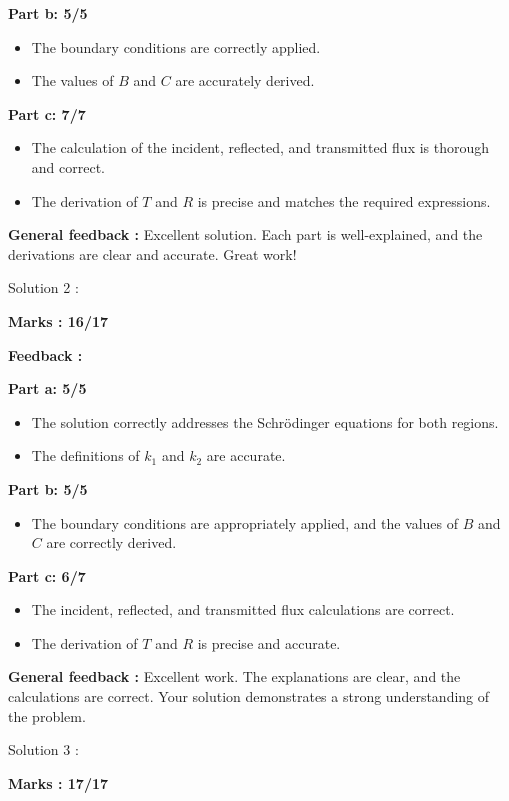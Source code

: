 \documentclass[a4paper,11pt]{article}
\begin{document}
\textbf{Part b: 5/5}
\begin{itemize}
    \item The boundary conditions are correctly applied.
    \item The values of $B$ and $C$ are accurately derived.
\end{itemize}

\textbf{Part c: 7/7}
\begin{itemize}
    \item The calculation of the incident, reflected, and transmitted flux is thorough and correct.
    \item The derivation of $T$ and $R$ is precise and matches the required expressions.
\end{itemize}


\textbf{General feedback :}
Excellent solution. Each part is well-explained, and the derivations are clear and accurate. Great work!


Solution 2 :

\textbf{Marks : 16/17}

\textbf{Feedback :}

\textbf{Part a: 5/5}
\begin{itemize}
    \item The solution correctly addresses the Schrödinger equations for both regions.
    \item The definitions of $k_1$ and $k_2$ are accurate.
\end{itemize}


\textbf{Part b: 5/5}
\begin{itemize}
    \item The boundary conditions are appropriately applied, and the values of $B$ and $C$ are correctly derived.
\end{itemize}

\textbf{Part c: 6/7}
\begin{itemize}
    \item The incident, reflected, and transmitted flux calculations are correct.
    \item The derivation of $T$ and $R$ is precise and accurate.
\end{itemize}


\textbf{General feedback :}
Excellent work. The explanations are clear, and the calculations are correct. Your solution demonstrates a strong understanding of the problem.


Solution 3 :


\textbf{Marks : 17/17}
\end{document}
